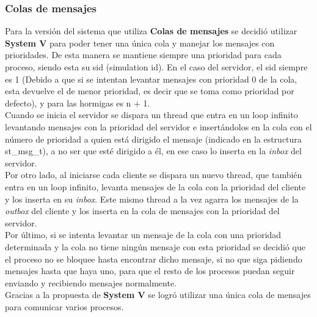 \documentclass[a4paper,10pt]{article}
\begin{document}
\subsubsection{Colas de mensajes}
Para la versión del sistema que utiliza \textbf{Colas de mensajes} se decidió utilizar \textbf{System V} para poder tener una única cola y 
manejar los mensajes con prioridades. De esta manera se mantiene siempre una prioridad para cada proceso, siendo esta su sid (simulation id).
En el caso del servidor, el sid siempre es 1 (Debido a que si se intentan levantar mensajes con prioridad 0 de la cola, esta devuelve el de menor 
prioridad, es decir que se toma como prioridad por defecto), y para las hormigas es n + 1.\\
Cuando se inicia el servidor se dispara un thread que entra en un loop infinito levantando mensajes con la prioridad del servidor e 
insertándolos en la cola con el número de prioridad a quien está dirigido el mensaje (indicado en la estructura st\_msg\_t), a no ser que esté 
dirigido a él, en ese caso lo inserta en la \textit{inbox} del servidor.\\
Por otro lado, al iniciarse cada cliente se dispara un nuevo thread, que también entra en un loop infinito, levanta mensajes de la cola 
con la prioridad del cliente y los inserta en su \textit{inbox}. Este mismo thread a la vez agarra los mensajes de la \textit{outbox} del 
cliente y los inserta en la cola de mensajes con la prioridad del servidor.\\
Por último, si se intenta levantar un mensaje de la cola con una prioridad determinada y la cola no tiene ningún mensaje con esta prioridad se 
decidió que el proceso no se bloquee hasta encontrar dicho mensaje, si no que siga pidiendo mensajes hasta que haya uno, para que el resto de los 
procesos puedan seguir enviando y recibiendo mensajes normalmente.\\
Gracias a la propuesta de \textbf{System V} se logró utilizar una única cola de mensajes para comunicar varios procesos.







\bigskip
\end{document}
